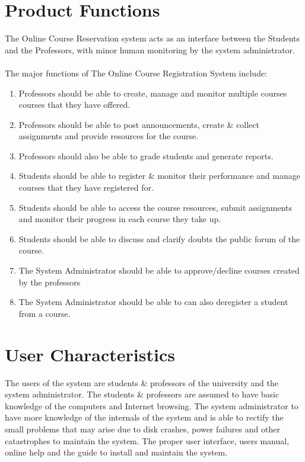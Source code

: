 \documentclass[12pt, a4]{report}
\begin{document}
\section{Product Functions}
The Online Course Reservation system acts as an interface between the Students and the Professors, with minor human monitoring by the system administrator.
\\\\
The major functions of The Online Course Registration System include:
\begin{enumerate}
    \item Professors should be able to create, manage and monitor multiple courses courses that they have offered.
    \item Professors should be able to post announcements, create \& collect assignments and provide resources for the course.
    \item Professors should also be able to grade students and generate reports.
    \item Students should be able to register \& monitor their performance and manage courses that they have registered for. 
    \item Students should be able to access the course resources, submit assignments and monitor their progress in each course they take up.
    \item Students should be able to discuss and clarify doubts the public forum of the course.
    \item The System Administrator should be able to approve/decline courses created by the professors \item The System Administrator should be able to can also deregister a student from a course.
\end{enumerate}


\section{User Characteristics}
The users of the system are students \& professors of the university and the system administrator.
The students \& professors are assumed to have basic knowledge of the computers and Internet browsing.
The system administrator to have more knowledge of the internals of the system and is able to rectify the small problems that may arise due to disk crashes, power failures and other catastrophes to maintain the system. The proper user interface, users manual, online help and the guide to install and maintain the system.
\end{document}
